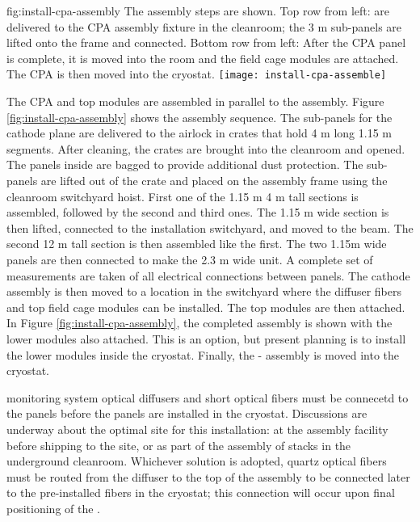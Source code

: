 \begin{dunefigure}{fig:install-cpa-assembly}
  {The  assembly steps are shown. Top row from left:   are delivered to the CPA assembly fixture in the cleanroom; the 3 \si{m} sub-panels are lifted onto the frame and connected. Bottom row from left: After the CPA panel is complete, it is moved into the room and the field cage modules are attached. The CPA is then moved into the cryostat.}
\texttt{[image: install-cpa-assemble]}
\end{dunefigure}

The CPA and top  modules are assembled in parallel to the  assembly. Figure \ref{fig:install-cpa-assembly} shows the  assembly sequence. The sub-panels for the cathode plane are delivered to the airlock in crates that hold 4 \si{m} long 1.15 \si{m} segments. After cleaning, the crates are brought into the cleanroom and opened. The panels inside are bagged to provide additional dust protection. The sub-panels are lifted out of the crate and placed on the assembly frame using the cleanroom switchyard hoist. First one of the 1.15 \si{m} 4 
\si{m} tall sections is assembled, followed by the second and third ones. The 1.15 \si{m} wide section is then lifted, connected to the installation switchyard, and moved to the  beam. The second 12 \si{m} tall section is then assembled like the first. The two 1.15m wide panels are then connected to make the 2.3 \si{m} wide unit.  A complete set of  measurements are taken of all electrical connections between panels.  The cathode assembly  is then moved to a location in the switchyard where the diffuser fibers and top field cage modules can be installed.
 The top  modules are then attached. In Figure \ref{fig:install-cpa-assembly}, the completed assembly is shown with the lower  modules also attached. This is an option, but present planning is to install the lower  modules  inside the cryostat. Finally, the - assembly is moved into the cryostat.


 monitoring system optical diffusers and short optical fibers must be connecetd to the  panels before the panels are installed in the cryostat.  Discussions are underway about the optimal site for this installation:  at the  assembly facility before shipping to the site, or as part of the assembly of  stacks in the underground cleanroom.  Whichever solution is adopted, quartz optical fibers must be routed from the diffuser to the top of the  assembly to be connected later to the pre-installed fibers in the cryostat; this connection will occur upon final positioning of the .  


